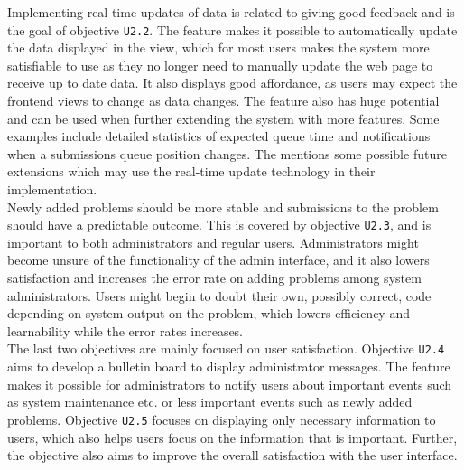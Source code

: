 Implementing real-time updates of data is related to giving good feedback and is the goal of objective \texttt{U2.2}. The feature makes it possible to automatically update the data displayed in the view, which for most users makes the system more satisfiable to use as they no longer need to manually update the web page to receive up to date data. It also displays good affordance, as users may expect the frontend views to change as data changes. The feature also has huge potential and can be used when further extending the system with more features. Some examples include detailed statistics of expected queue time and notifications when a submissions queue position changes. The  mentions some possible future extensions which may use the real-time update technology in their implementation. \\

Newly added problems should be more stable and submissions to the problem should have a predictable outcome. This is covered by objective \texttt{U2.3}, and is important to both administrators and regular users. Administrators might become unsure of the functionality of the admin interface, and it also lowers satisfaction and increases the error rate on adding problems among system administrators. Users might begin to doubt their own, possibly correct, code depending on system output on the problem, which lowers efficiency and learnability while the error rates increases. \\

The last two objectives are mainly focused on user satisfaction. Objective \texttt{U2.4} aims to develop a bulletin board to display administrator messages. The feature makes it possible for administrators to notify users about important events such as system maintenance etc. or less important events such as newly added problems. Objective \texttt{U2.5} focuses on displaying only necessary information to users, which also helps users focus on the information that is important. Further, the objective also aims to improve the overall satisfaction with the user interface.
